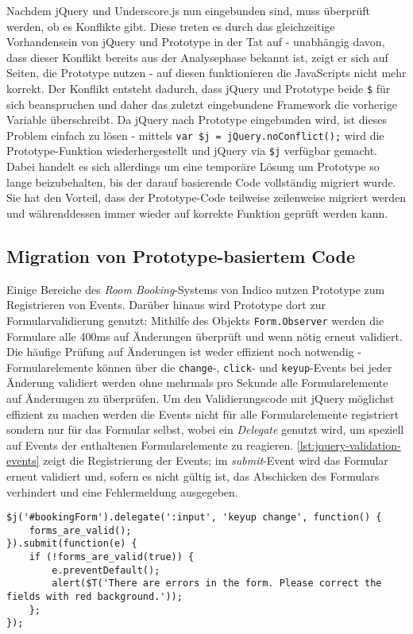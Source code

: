 Nachdem jQuery und Underscore.js nun eingebunden sind, muss überprüft werden, ob es Konflikte gibt.
Diese treten es durch das gleichzeitige Vorhandensein von jQuery und Prototype in der Tat auf - unabhängig
davon, dass dieser Konflikt bereits aus der Analysephase bekannt ist, zeigt er sich auf Seiten, die
Prototype nutzen - auf diesen funktionieren die JavaScripts nicht mehr korrekt. Der Konflikt
entsteht dadurch, dass jQuery und Prototype beide \lstinline{$} für sich beanspruchen und daher das
zuletzt eingebundene Framework die vorherige Variable überschreibt. Da jQuery nach Prototype
eingebunden wird, ist dieses Problem einfach zu lösen - mittels
\lstinline{var $j = jQuery.noConflict();} wird die Prototype-Funktion wiederhergestellt und jQuery
via \lstinline{$j} verfügbar gemacht. Dabei handelt es sich allerdings um eine temporäre Lösung um
Prototype so lange beizubehalten, bis der darauf basierende Code vollständig migriert wurde. Sie hat
den Vorteil, dass der Prototype-Code teilweise zeilenweise migriert werden und währenddessen immer
wieder auf korrekte Funktion geprüft werden kann.

\subsection{Migration von Prototype-basiertem Code}

Einige Bereiche des \emph{Room Booking}-Systems von Indico nutzen Prototype zum Registrieren von
Events. Darüber hinaus wird Prototype dort zur Formularvalidierung genutzt: Mithilfe des Objekts
\lstinline{Form.Observer} werden die Formulare alle 400ms auf Änderungen überprüft und wenn nötig
erneut validiert. Die häufige Prüfung auf Änderungen ist weder effizient noch notwendig -
Formularelemente können über die \lstinline{change}-, \lstinline{click}- und
\lstinline{keyup}-Events bei jeder Änderung validiert werden ohne mehrmals pro Sekunde alle
Formularelemente auf Änderungen zu überprüfen. Um den Validierungscode mit jQuery möglichst
effizient zu machen werden die Events nicht für alle Formularelemente registriert sondern nur für
das Formular selbst, wobei ein \emph{Delegate} genutzt wird, um speziell auf Events der enthaltenen
Formularelemente zu reagieren. \autoref{lst:jquery-validation-events} zeigt die Registrierung der
Events; im \emph{submit}-Event wird das Formular erneut validiert und, sofern es nicht gültig ist,
das Abschicken des Formulars verhindert und eine Fehlermeldung ausgegeben.

\begin{lstlisting}[caption=Formularvalidierung via jQuery,label=lst:jquery-validation-events]
$j('#bookingForm').delegate(':input', 'keyup change', function() {
    forms_are_valid();
}).submit(function(e) {
    if (!forms_are_valid(true)) {
        e.preventDefault();
        alert($T('There are errors in the form. Please correct the fields with red background.'));
    };
});
\end{lstlisting}

